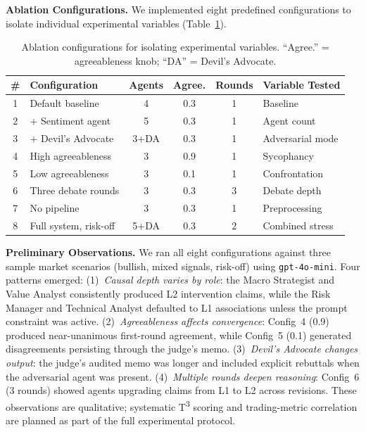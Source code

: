 \documentclass{article}
\begin{document}
\textbf{Ablation Configurations.}
We implemented eight predefined configurations to isolate individual experimental variables (Table~\ref{tab:ablation-configs}).

\begin{table}[h]
\centering
\small
\begin{tabular}{@{}clcccl@{}}
\toprule
\textbf{\#} & \textbf{Configuration} & \textbf{Agents} & \textbf{Agree.} & \textbf{Rounds} & \textbf{Variable Tested} \\
\midrule
1 & Default baseline         & 4 & 0.3 & 1 & Baseline \\
2 & + Sentiment agent        & 5 & 0.3 & 1 & Agent count \\
3 & + Devil's Advocate       & 3+DA & 0.3 & 1 & Adversarial mode \\
4 & High agreeableness       & 3 & 0.9 & 1 & Sycophancy \\
5 & Low agreeableness        & 3 & 0.1 & 1 & Confrontation \\
6 & Three debate rounds      & 3 & 0.3 & 3 & Debate depth \\
7 & No pipeline              & 3 & 0.3 & 1 & Preprocessing \\
8 & Full system, risk-off    & 5+DA & 0.3 & 2 & Combined stress \\
\bottomrule
\end{tabular}
\vspace{4pt}
\caption{Ablation configurations for isolating experimental variables. ``Agree.'' = agreeableness knob; ``DA'' = Devil's Advocate.}
\label{tab:ablation-configs}
\end{table}

\textbf{Preliminary Observations.}
We ran all eight configurations against three sample market scenarios (bullish, mixed signals, risk-off) using \texttt{gpt-4o-mini}. Four patterns emerged:
(1)~\emph{Causal depth varies by role}: the Macro Strategist and Value Analyst consistently produced L2 intervention claims, while the Risk Manager and Technical Analyst defaulted to L1 associations unless the prompt constraint was active.
(2)~\emph{Agreeableness affects convergence}: Config~4 (0.9) produced near-unanimous first-round agreement, while Config~5 (0.1) generated disagreements persisting through the judge's memo.
(3)~\emph{Devil's Advocate changes output}: the judge's audited memo was longer and included explicit rebuttals when the adversarial agent was present.
(4)~\emph{Multiple rounds deepen reasoning}: Config~6 (3 rounds) showed agents upgrading claims from L1 to L2 across revisions. These observations are qualitative; systematic T\textsuperscript{3} scoring and trading-metric correlation are planned as part of the full experimental protocol.
\end{document}

